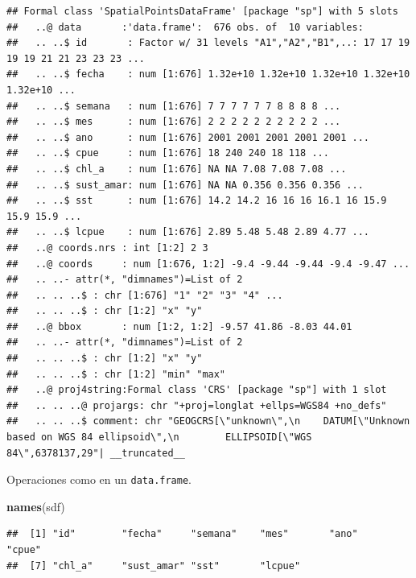 \documentclass[
]{book}
\newenvironment{Shaded}{\begin{snugshade}}{\end{snugshade}}
\newcommand{\CommentTok}[1]{\textcolor[rgb]{0.56,0.35,0.01}{\textit{#1}}}
\newcommand{\FunctionTok}[1]{\textcolor[rgb]{0.13,0.29,0.53}{\textbf{#1}}}
\newcommand{\NormalTok}[1]{#1}
\newcommand{\SpecialCharTok}[1]{\textcolor[rgb]{0.81,0.36,0.00}{\textbf{#1}}}
\theoremstyle{break}
\theoremstyle{definition}
\theoremstyle{definition}
\theoremstyle{definition}
\theoremstyle{definition}
\theoremstyle{remark}
\begin{document}
\begin{verbatim}
## Formal class 'SpatialPointsDataFrame' [package "sp"] with 5 slots
##   ..@ data       :'data.frame':  676 obs. of  10 variables:
##   .. ..$ id       : Factor w/ 31 levels "A1","A2","B1",..: 17 17 19 19 19 21 21 23 23 23 ...
##   .. ..$ fecha    : num [1:676] 1.32e+10 1.32e+10 1.32e+10 1.32e+10 1.32e+10 ...
##   .. ..$ semana   : num [1:676] 7 7 7 7 7 7 8 8 8 8 ...
##   .. ..$ mes      : num [1:676] 2 2 2 2 2 2 2 2 2 2 ...
##   .. ..$ ano      : num [1:676] 2001 2001 2001 2001 2001 ...
##   .. ..$ cpue     : num [1:676] 18 240 240 18 118 ...
##   .. ..$ chl_a    : num [1:676] NA NA 7.08 7.08 7.08 ...
##   .. ..$ sust_amar: num [1:676] NA NA 0.356 0.356 0.356 ...
##   .. ..$ sst      : num [1:676] 14.2 14.2 16 16 16 16.1 16 15.9 15.9 15.9 ...
##   .. ..$ lcpue    : num [1:676] 2.89 5.48 5.48 2.89 4.77 ...
##   ..@ coords.nrs : int [1:2] 2 3
##   ..@ coords     : num [1:676, 1:2] -9.4 -9.44 -9.44 -9.4 -9.47 ...
##   .. ..- attr(*, "dimnames")=List of 2
##   .. .. ..$ : chr [1:676] "1" "2" "3" "4" ...
##   .. .. ..$ : chr [1:2] "x" "y"
##   ..@ bbox       : num [1:2, 1:2] -9.57 41.86 -8.03 44.01
##   .. ..- attr(*, "dimnames")=List of 2
##   .. .. ..$ : chr [1:2] "x" "y"
##   .. .. ..$ : chr [1:2] "min" "max"
##   ..@ proj4string:Formal class 'CRS' [package "sp"] with 1 slot
##   .. .. ..@ projargs: chr "+proj=longlat +ellps=WGS84 +no_defs"
##   .. .. ..$ comment: chr "GEOGCRS[\"unknown\",\n    DATUM[\"Unknown based on WGS 84 ellipsoid\",\n        ELLIPSOID[\"WGS 84\",6378137,29"| __truncated__
\end{verbatim}

Operaciones como en un \texttt{data.frame}.

\begin{Shaded}
\begin{Highlighting}[]
\FunctionTok{names}\NormalTok{(sdf)}
\end{Highlighting}
\end{Shaded}

\begin{verbatim}
##  [1] "id"        "fecha"     "semana"    "mes"       "ano"       "cpue"     
##  [7] "chl_a"     "sust_amar" "sst"       "lcpue"
\end{verbatim}

\begin{Shaded}
\end{Shaded}
\end{document}
